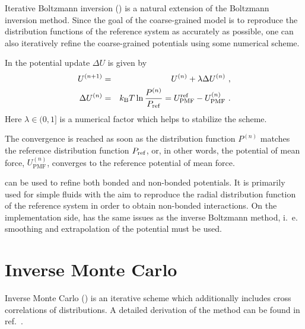 Iterative Boltzmann inversion (\ibi) is a natural extension of the Boltzmann inversion method. Since the goal of the coarse-grained model is to reproduce the distribution functions of the reference system as accurately as possible, one can also iteratively refine the coarse-grained potentials using some numerical scheme.

In \ibi the potential update $\Delta U$ is given by~\cite{Reith:2003}
\begin{eqnarray}
  \label{eq:iter_boltzmann}
  U^{(n+1)} &=& U^{(n)} + \lambda \Delta U^{(n)}~, \\
  \Delta U^{(n)} &=&  k_\text{B} T \ln  \frac{P^{(n)}}{P_{\rm ref}}
  =  U_\text{PMF}^\text{ref} - U_\text{PMF}^{(n)}~.
\end{eqnarray}
Here $\lambda \in (0,1]$ is a numerical factor which helps to stabilize the scheme.

The convergence is reached as soon as the distribution function $P^{(n)}$ matches the reference distribution function $P_{\rm ref}$, or, in other words, the potential of mean force, $U_\text{PMF}^{(n)}$, converges to the reference potential of mean force.

\ibi can be used to refine both bonded and non-bonded potentials. It is primarily used for simple fluids with the aim to reproduce the radial distribution function of the reference system in order to obtain non-bonded interactions. On the implementation side, \ibi has the same issues as the inverse Boltzmann method, i.~e. smoothing and extrapolation of the potential must be used.


\section{Inverse Monte Carlo}
\label{sec:imc}

Inverse Monte Carlo (\imc) is an iterative scheme which additionally includes cross correlations of distributions. A detailed derivation of the \imc method can be found in ref.~\cite{Lyubartsev:1995}.

